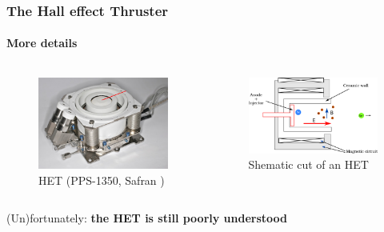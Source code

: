 \documentclass[sans, aspectratio=169]{beamer}
\begin{document}
\begin{frame} 
	\frametitle{The Hall effect Thruster} 
	\framesubtitle{More details} 

\begin{columns}

	\begin{column}{0.45\linewidth}
		\begin{figure}[hbtp]
		\centering
		\includegraphics[scale=0.25]{images/PPS1350-G.png}
		\caption{HET (PPS-1350, Safran )}
		\end{figure}
	
	\end{column}

	\begin{column}{0.45\linewidth}
		\begin{figure}[hbtp]
		\centering
		\includegraphics[scale=0.7]{images/HET.png}
		\caption{Shematic cut of an HET}
		\end{figure}
	
	\end{column}

\end{columns}	
\pause
\begin{center}
	(Un)fortunately: \textbf{the HET is still poorly understood}

\end{center}
\end{frame}
\end{document}
